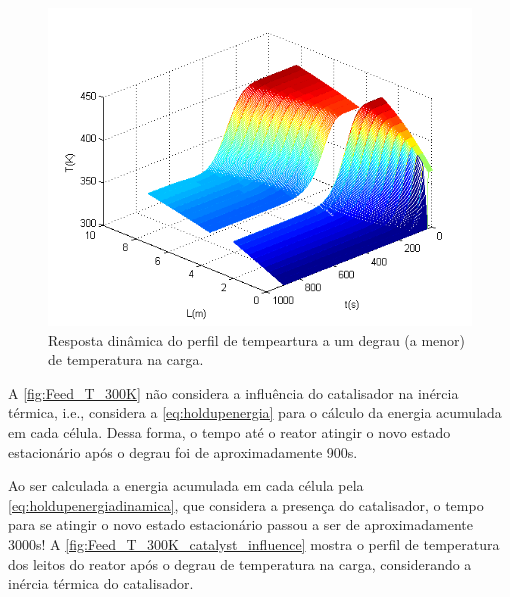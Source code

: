 \begin{figure}[htb]
\centering
\includegraphics[scale=0.8]{images/Chap4/Feed_T_300K.png}
\caption{Resposta dinâmica do perfil de tempeartura a um degrau (a menor) de
temperatura na carga.}
\label{fig:Feed_T_300K}
\end{figure}

A \autoref{fig:Feed_T_300K} não considera a influência do catalisador na inércia
térmica, i.e., considera a \autoref{eq:holdupenergia} para o cálculo da energia
acumulada em cada célula. Dessa forma, o tempo até o reator atingir o novo
estado estacionário após o degrau foi de aproximadamente \si{900}{s}.

Ao ser calculada a energia acumulada em cada célula pela
\autoref{eq:holdupenergiadinamica}, que considera a presença do catalisador, o
tempo para se atingir o novo estado estacionário passou a ser de aproximadamente
\si{3000}{s}! A \autoref{fig:Feed_T_300K_catalyst_influence} mostra o perfil de
temperatura dos leitos do reator após o degrau de temperatura na carga,
considerando a inércia térmica do catalisador.

